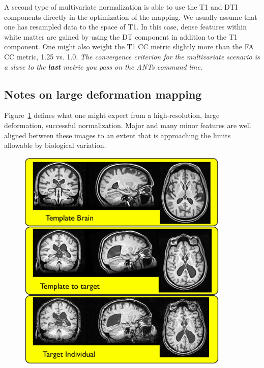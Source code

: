 \documentclass{InsightArticle}
\begin{document}
A second type of multivariate normalization is able to use the T1 and DTI components 
directly in the optimization of the mapping.  We usually assume that one has resampled data to the space of T1.
In this case, dense features within white matter are gained by using the DT component  
in addition to the T1 component.   One might also weight the T1 CC metric slightly more 
than the FA CC metric, 1.25 vs. 1.0.  {\em The convergence criterion for 
the multivariate scenario is a slave to the {\bf last} metric you 
pass on the ANTs command line}.

\subsection{Notes on large deformation mapping} 
Figure~\ref{fig:large} defines what one might expect from a 
high-resolution, large deformation, successful normalization.  
Major and many minor features are well aligned between 
these images to an extent that is approaching the limits 
allowable by biological variation.  
\begin{figure}
\includegraphics[width=0.9\textwidth]{Figures/ANTSLargeDef.jpg} 
\label{fig:large}
\end{figure}
\end{document}
